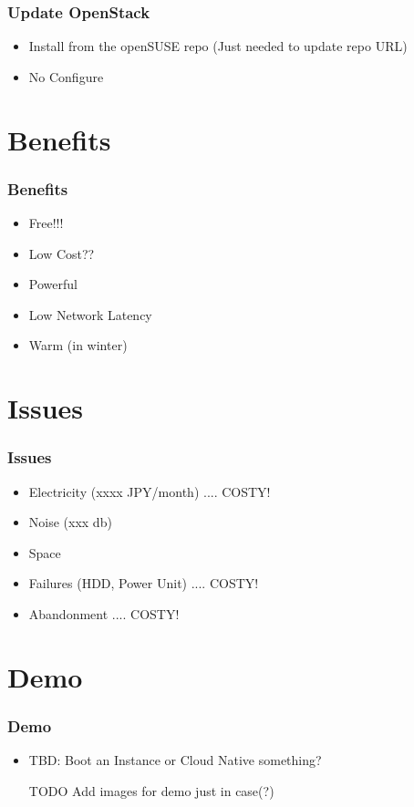 \documentclass[aspectratio=169,11pt,hyperref={colorlinks=true}]{beamer}
\begin{document}
\begin{frame}
  \frametitle{Update OpenStack}
  \begin{itemize}
    \item Install from the openSUSE repo (Just needed to update repo URL)
    \item No Configure
  \end{itemize}
\end{frame}

\section{Benefits}
\begin{frame}
  \frametitle{Benefits}
  \begin{itemize}
    \item Free!!!
    \item Low Cost??
    \item Powerful
    \item Low Network Latency
    \item Warm (in winter)
  \end{itemize}
\end{frame}

\section{Issues}
\begin{frame}
  \frametitle{Issues}
  \begin{itemize}
    \item Electricity (xxxx JPY/month) .... COSTY!
    \item Noise (xxx db)
    \item Space
    \item Failures (HDD, Power Unit) .... COSTY!
    \item Abandonment .... COSTY!
  \end{itemize}
\end{frame}

\section{Demo}
\begin{frame}
  \frametitle{Demo}
  \begin{itemize}
    \item TBD: Boot an Instance or Cloud Native something?
    \item [TODO] Add images for demo just in case(?)
  \end{itemize}
\end{frame}
\end{document}
